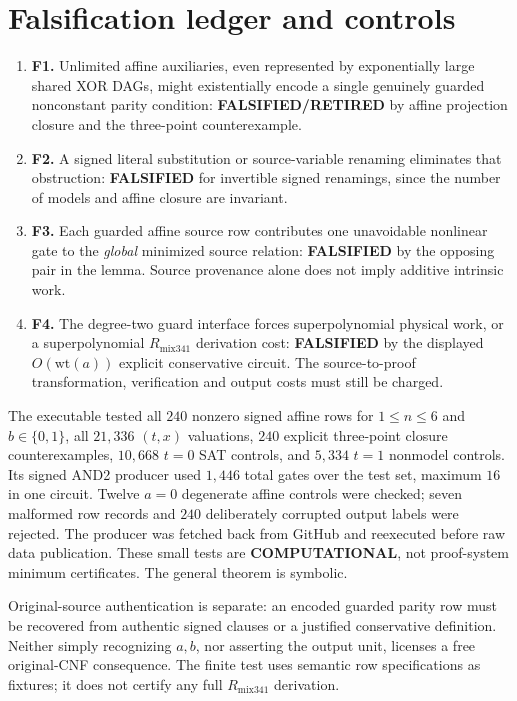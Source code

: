 \documentclass[11pt]{article}
\newcommand{\Rmix}{R_{\mathrm{mix341}}}
\begin{document}
\section*{Falsification ledger and controls}
\begin{enumerate}
\item[] \textbf{F1.} Unlimited affine auxiliaries, even represented by exponentially large shared XOR DAGs, might existentially encode a single genuinely guarded nonconstant parity condition: \textbf{FALSIFIED/RETIRED} by affine projection closure and the three-point counterexample.
\item[] \textbf{F2.} A signed literal substitution or source-variable renaming eliminates that obstruction: \textbf{FALSIFIED} for invertible signed renamings, since the number of models and affine closure are invariant.
\item[] \textbf{F3.} Each guarded affine source row contributes one unavoidable nonlinear gate to the \emph{global} minimized source relation: \textbf{FALSIFIED} by the opposing pair in the lemma. Source provenance alone does not imply additive intrinsic work.
\item[] \textbf{F4.} The degree-two guard interface forces superpolynomial physical work, or a superpolynomial $\Rmix$ derivation cost: \textbf{FALSIFIED} by the displayed $O(\mathrm{wt}(a))$ explicit conservative circuit. The source-to-proof transformation, verification and output costs must still be charged.
\end{enumerate}

The executable tested all $240$ nonzero signed affine rows for $1\le n\le6$ and $b\in\{0,1\}$, all $21{,}336$ $(t,x)$ valuations, $240$ explicit three-point closure counterexamples, $10{,}668$ $t=0$ SAT controls, and $5{,}334$ $t=1$ nonmodel controls. Its signed AND2 producer used $1{,}446$ total gates over the test set, maximum $16$ in one circuit. Twelve $a=0$ degenerate affine controls were checked; seven malformed row records and $240$ deliberately corrupted output labels were rejected. The producer was fetched back from GitHub and reexecuted before raw data publication. These small tests are \textbf{COMPUTATIONAL}, not proof-system minimum certificates. The general theorem is symbolic.

Original-source authentication is separate: an encoded guarded parity row must be recovered from authentic signed clauses or a justified conservative definition. Neither simply recognizing $a,b$, nor asserting the output unit, licenses a free original-CNF consequence. The finite test uses semantic row specifications as fixtures; it does not certify any full $\Rmix$ derivation.
\end{document}
